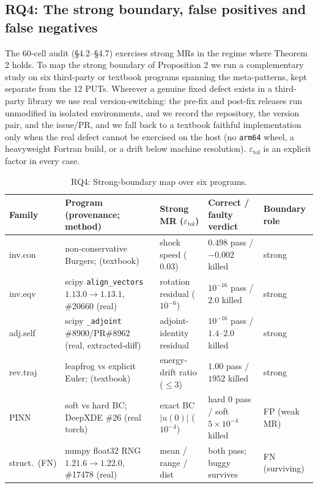 \documentclass[acmsmall,screen,review]{acmart}
\begin{document}
\subsection{RQ4: The strong boundary, false positives and false negatives}\label{rq4-strong-boundary}

The 60-cell audit (§4.2--§4.7) exercises strong MRs in the regime where
Theorem 2 holds. To map the strong boundary of Proposition 2 we run a
complementary study on six third-party or textbook programs spanning the
meta-patterns, kept separate from the 12 PUTs. Wherever a genuine fixed
defect exists in a third-party library we use real version-switching:
the pre-fix and post-fix releases run unmodified in isolated environments,
and we record the repository, the version pair, and the issue/PR, and
we fall back to a textbook faithful implementation only when the real
defect cannot be exercised on the host (no \texttt{arm64} wheel, a
heavyweight Fortran build, or a drift below machine resolution).
$\varepsilon_{\mathrm{tol}}$ is an explicit factor in every case.

{\def\LTcaptype{table} %
\begin{longtable}[]{@{}p{1.6cm}p{3.4cm}p{2.5cm}p{2.6cm}p{1.7cm}@{}}
\caption{RQ4: Strong-boundary map over six programs.}\label{tab:p2-30}\\
\toprule\noalign{}
Family & Program (provenance; method) & Strong MR ($\varepsilon_{\mathrm{tol}}$) & Correct / faulty verdict & Boundary role \\
\midrule\noalign{}
\endfirsthead
\endhead
\bottomrule\noalign{}
\endlastfoot
inv.con & non-conservative Burgers; \citep{hou1994nonconservative} (textbook) & shock speed ($0.03$) & $0.498$ pass / $-0.002$ killed & strong \\
inv.eqv & scipy \texttt{align\_vectors} $1.13.0\to1.13.1$, \#20660 (real) & rotation residual ($10^{-6}$) & $10^{-16}$ pass / $2.0$ killed & strong \\
adj.self & scipy \texttt{\_adjoint} \#8900/PR\#8962 (real, extracted-diff) & adjoint-identity residual & $10^{-16}$ pass / $1.4$--$2.0$ killed & strong \\
rev.traj & leapfrog vs explicit Euler; \citep{hairer2006geometric} (textbook) & energy-drift ratio ($\leq 3$) & $1.00$ pass / $1952$ killed & strong \\
PINN & soft vs hard BC; DeepXDE \#26 (real torch) & exact BC $|u(0)|$ ($10^{-4}$) & hard $0$ pass / soft $5\times10^{-4}$ killed & FP (weak MR) \\
struct.\ (FN) & numpy float32 RNG $1.21.6\to1.22.0$, \#17478 (real) & mean / range / dist & both pass; buggy survives & FN (surviving) \\
\end{longtable}
}
\end{document}
